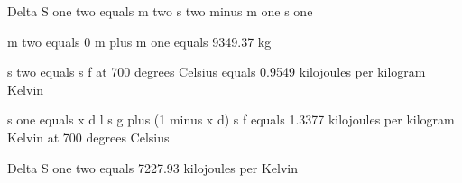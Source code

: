 Delta S one two equals m two s two minus m one s one

m two equals 0 m plus m one equals 9349.37 kg

s two equals s f at 700 degrees Celsius equals 0.9549 kilojoules per kilogram Kelvin

s one equals x d l s g plus (1 minus x d) s f equals 1.3377 kilojoules per kilogram Kelvin at 700 degrees Celsius

Delta S one two equals 7227.93 kilojoules per Kelvin